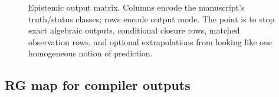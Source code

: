 \begin{figure}[t]
\caption{Epistemic output matrix. Columns encode the manuscript's truth/status classes; rows encode output mode. The point is to stop exact algebraic outputs, conditional closure rows, matched observation rows, and optional extrapolations from looking like one homogeneous notion of prediction.}
\label{fig:epistemic-output-matrix}
\end{figure}

\subsection{RG map for compiler outputs}
\label{sec:rg-map-compiler-outputs}

